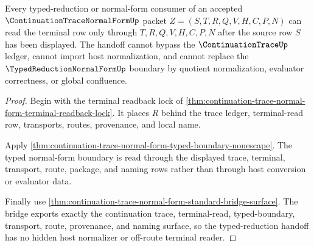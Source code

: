 \begin{theorem}
\label{thm:continuation-trace-normal-form-typed-reduction-handoff}
Every typed-reduction or normal-form consumer of an accepted $\ContinuationTraceNormalFormUp$ packet $Z=(S,T,R,Q,V,H,C,P,N)$ can read the terminal row only through $T,R,Q,V,H,C,P,N$ after the source row $S$ has been displayed. The handoff cannot bypass the $\ContinuationTraceUp$ ledger, cannot import host normalization, and cannot replace the $\TypedReductionNormalFormUp$ boundary by quotient normalization, evaluator correctness, or global confluence.
\end{theorem}
\begin{proof}
Begin with the terminal readback lock of \autoref{thm:continuation-trace-normal-form-terminal-readback-lock}. It places $R$ behind the trace ledger, terminal-read row, transports, routes, provenance, and local name.

Apply \autoref{thm:continuation-trace-normal-form-typed-boundary-nonescape}. The typed normal-form boundary is read through the displayed trace, terminal, transport, route, package, and naming rows rather than through host conversion or evaluator data.

Finally use \autoref{thm:continuation-trace-normal-form-standard-bridge-surface}. The bridge exports exactly the continuation trace, terminal-read, typed-boundary, transport, route, provenance, and naming surface, so the typed-reduction handoff has no hidden host normalizer or off-route terminal reader.
\end{proof}

